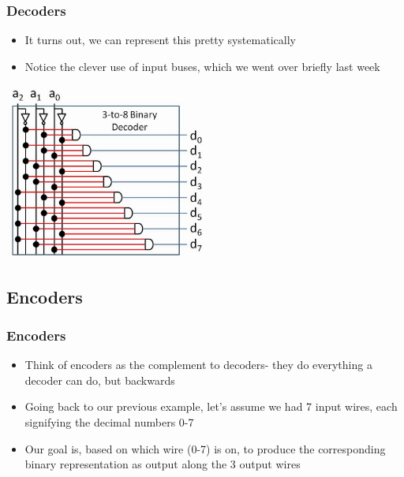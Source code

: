 \documentclass{beamer}
\begin{document}
       	\begin{frame}
       		\frametitle{Decoders}
       		\begin{itemize}
       			\item It turns out, we can represent this pretty systematically
       			\item Notice the clever use of input buses, which we went over briefly last week
       		\end{itemize}
       		
       		\centering
       		\includegraphics[width=0.5\textwidth]{decoder2}
       	\end{frame}
       	
       	\subsection{Encoders}
       	
       	\begin{frame}
       		\frametitle{Encoders}
       		\begin{itemize}
       			\item Think of encoders as the complement to decoders- they do everything a decoder can do, but backwards
       			\item Going back to our previous example, let's assume we had 7 input wires, each signifying the decimal numbers 0-7
       			\item Our goal is, based on which wire (0-7) is on, to produce the corresponding binary representation as output along the 3 output wires
       		\end{itemize}
       	\end{frame}
       	
\end{document}
